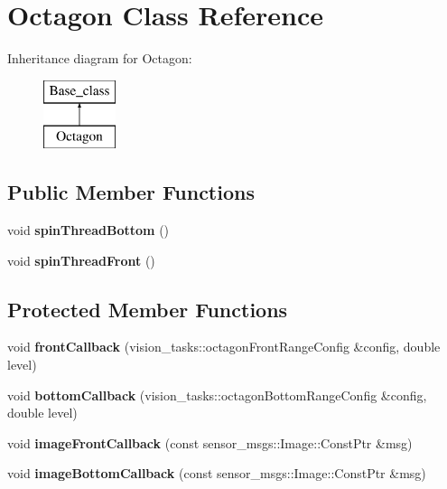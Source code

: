 \hypertarget{classOctagon}{}\section{Octagon Class Reference}
\label{classOctagon}
Inheritance diagram for Octagon\+:\begin{figure}[H]
\begin{center}
\leavevmode
\includegraphics[height=2.000000cm]{classOctagon}
\end{center}
\end{figure}
\subsection*{Public Member Functions}
\begin{DoxyCompactItemize}
\item 
\mbox{\label{classOctagon_ae6a83e650bae938f9ab63abcfd58a398}} 
void {\bfseries spin\+Thread\+Bottom} ()
\item 
\mbox{\label{classOctagon_a4a7d77e22163d6ee6c1f11210ed2a61d}} 
void {\bfseries spin\+Thread\+Front} ()
\end{DoxyCompactItemize}
\subsection*{Protected Member Functions}
\begin{DoxyCompactItemize}
\item 
\mbox{\label{classOctagon_a7a1450a53ab430cbdf013159e837c848}} 
void {\bfseries front\+Callback} (vision\+\_\+tasks\+::octagon\+Front\+Range\+Config \&config, double level)
\item 
\mbox{\label{classOctagon_ad953bf1ace4c8a2d09f364a096030df4}} 
void {\bfseries bottom\+Callback} (vision\+\_\+tasks\+::octagon\+Bottom\+Range\+Config \&config, double level)
\item 
\mbox{\label{classOctagon_a3840f97fdb1c59d6a9015e7502a94a4d}} 
void {\bfseries image\+Front\+Callback} (const sensor\+\_\+msgs\+::\+Image\+::\+Const\+Ptr \&msg)
\item 
\mbox{\label{classOctagon_a4c98afeabdf2d48a7a794cf58dba3e93}} 
void {\bfseries image\+Bottom\+Callback} (const sensor\+\_\+msgs\+::\+Image\+::\+Const\+Ptr \&msg)
\end{DoxyCompactItemize}

